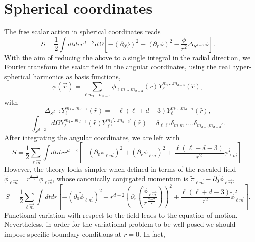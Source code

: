 \documentclass[12pt,a4paper]{article}
\begin{document}
\section{Spherical coordinates}\label{sec:Spherical coordinates}
The free scalar action in spherical coordinates reads
\begin{equation}
S=\frac{1}{2}\int dt dr r^{d-2}d\Omega \left[-(\partial_0 \phi)^2+ (\partial_r \phi)^2- \frac{\phi}{r^2}\Delta_{S^{d-2}}\phi\right].
\end{equation}
With the aim of reducing the above to a single integral in the radial direction, we Fourier transform the scalar field in the angular coordinates, using the real hyper-spherical harmonics as basis functions,
\begin{equation}
\phi(\vec{r})=\sum_{\ell m_1 ... m_{d-3}}\phi_{\ell m_1 ... m_{d-3}}(r) Y_{\ell}^{m_1 ... m_{d-3}}(\hat{r}),
\end{equation}
with
\begin{equation}
\Delta_{S^{d-2}}Y_{\ell}^{m_1 ...m_{d-3}}(\hat{r})=-\ell(\ell+d-3)Y_{\ell}^{m_1 ...m_{d-3}}(\hat{r}),
\end{equation}
\begin{equation}
\int_{S^{d-2}}d\Omega Y_{\ell}^{m_1 ... m_{d-3}}(\hat{r}){Y}_{\ell '}^{m_1 ' ... m_{d-3}'}(\hat{r})=\delta_{\ell\ell '}\delta_{m_1 m_1'}...\delta_{m_{d-3} m_{d-3}'}.
\end{equation}
After integrating the angular coordinates, we are left with
\begin{equation}
S=\frac{1}{2}\sum_{\ell \vec{m}}\int dt dr r^{d-2} \left[-(\partial_0 \phi_{\ell\vec{m}})^2 +(\partial_r \phi_{\ell\vec{m}})^2+\frac{\ell(\ell+d-3)}{r^2} \phi_{\ell\vec{m}}^2 \right].
\end{equation} 
However, the theory looks simpler when defined in terms of the rescaled field $\widetilde{\phi}_{\ell\vec{m}}=r^{\frac{d-2}{2}}\phi_{\ell\vec{m}}$, whose canonically conjugated momentum is $\widetilde{\pi}_{\ell\vec{m}}\equiv \partial_0 \widetilde{\phi}_{\ell\vec{m}}$,
\begin{equation}\label{S1}
S=\frac{1}{2}\sum_{\ell \vec{m}}\int dt dr \left[-(\partial_0 \widetilde{\phi}_{\ell\vec{m}})^2 +r^{d-2}\left(\partial_r \left(\frac{\widetilde{\phi}_{\ell\vec{m}}}{r^{\frac{d-2}{2}}}\right)\right)^2+\frac{\ell(\ell+d-3)}{r^2} \widetilde{\phi}_{\ell\vec{m}}^2 \right].
\end{equation}
Functional variation with respect to the field leads to the equation of motion. Nevertheless, in order for the variational problem to be well posed we should impose specific boundary conditions at $r=0$. In fact,
\end{document}
